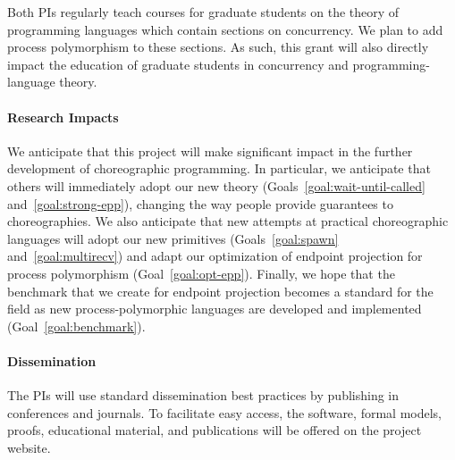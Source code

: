 Both PIs regularly teach courses for graduate students on the theory of programming languages which contain sections on concurrency.
We plan to add process polymorphism to these sections.
As such, this grant will also directly impact the education of graduate students in concurrency and programming-language theory.

\paragraph{Research Impacts}
We anticipate that this project will make significant impact in the further development of choreographic programming.
In particular, we anticipate that others will immediately adopt our new theory (Goals~\ref{goal:wait-until-called} and~\ref{goal:strong-epp}), changing the way people provide guarantees to choreographies.
We also anticipate that new attempts at practical choreographic languages will adopt our new primitives (Goals~\ref{goal:spawn} and~\ref{goal:multirecv}) and adapt our optimization of endpoint projection for process polymorphism (Goal~\ref{goal:opt-epp}).
Finally, we hope that the benchmark that we create for endpoint projection becomes a standard for the field as new process-polymorphic languages are developed and implemented (Goal~\ref{goal:benchmark}).

\paragraph{Dissemination}
The PIs will use standard dissemination best practices by publishing in conferences and journals.
To facilitate easy access, the software, formal models, proofs, educational material, and publications will be offered on the project website. 

